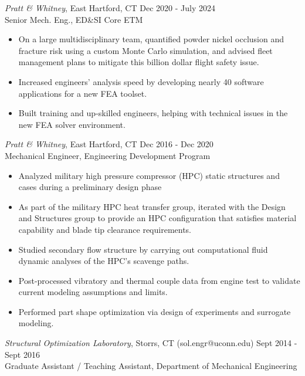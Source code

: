 \documentclass{res}
\begin{document}
\begin{resume}
{\sl Pratt \& Whitney}, East Hartford, CT \hfill        Dec 2020 - July 2024\\
Senior Mech. Eng., ED\&SI Core ETM
  \vspace{4pt}
   \begin{itemize} \itemsep 1pt %
   \item On a large multidisciplinary team, quantified powder nickel occlusion and fracture risk using a custom Monte Carlo simulation, and advised fleet management plans to mitigate this billion dollar flight safety issue.
   \item Increased engineers' analysis speed by developing nearly 40 software applications for a new FEA toolset. 
   \item Built training and up-skilled engineers, helping with technical issues in the new FEA solver environment.
 \end{itemize} \vspace{-3pt}

{\sl Pratt \& Whitney}, East Hartford, CT \hfill        Dec 2016 - Dec 2020\\
Mechanical Engineer, Engineering Development Program
\vspace{4pt}
 \begin{itemize} \itemsep 1pt
  \item  Analyzed military high pressure compressor (HPC) static structures and cases during a preliminary design phase
  \item  As part of the military HPC heat transfer group, iterated with the Design and Structures group to provide an HPC configuration that satisfies material capability and blade tip clearance requirements.
  \item Studied secondary flow structure by carrying out computational fluid dynamic analyses of the HPC's scavenge paths.
  \item Post-processed vibratory and thermal couple data from engine test to validate current modeling assumptions and limits.
  \item Performed part shape optimization via design of experiments and surrogate modeling.
 \end{itemize} \vspace{-3pt}
 
{\sl Structural Optimization Laboratory}, Storrs, CT (sol.engr@uconn.edu) \hfill                  Sept 2014 - Sept 2016\\
Graduate Assistant / Teaching Assistant, Department of Mechanical Engineering


\end{resume}
\end{document}
